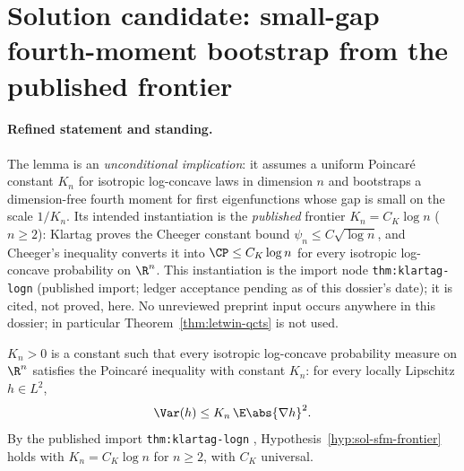 \documentclass[../main.tex]{subfiles}
\begin{document}
%
\section*{Solution candidate: small-gap fourth-moment bootstrap from the published
frontier}
\label{sec:sol-lem-mm-smallgap-fourth-moment}

\paragraph{Refined statement and standing.}
The lemma is an \emph{unconditional implication}: it assumes a uniform Poincar\'e
constant $K_n$ for isotropic log-concave laws in dimension $n$ and bootstraps a
dimension-free fourth moment for first eigenfunctions whose gap is small on the scale
$1/K_n$.  Its intended instantiation is the \emph{published} frontier
$K_n=C_K\log n$ ($n\ge2$): Klartag \cite{Klartag2023Logarithmic} proves the Cheeger
constant bound $\psi_n\le C\sqrt{\log n}$, and Cheeger's inequality converts it into
$\CP\le C_K\log n$ for every isotropic log-concave probability on $\R^n$.  This
instantiation is the import node \texttt{thm:klartag-logn} (published import; ledger
acceptance pending as of this dossier's date); it is cited, not proved, here.  No
unreviewed preprint input occurs anywhere in this dossier; in particular
Theorem~\ref{thm:letwin-qcts} is not used.

\begin{hypothesis}
\label{hyp:sol-sfm-frontier}
$K_n>0$ is a constant such that every isotropic log-concave probability measure on
$\R^n$ satisfies the Poincar\'e inequality with constant $K_n$: for every locally
Lipschitz $h\in L^2$,
\[
  \Var(h)\le K_n\,\E\abs{\nabla h}^2 .
\]
By the published import \texttt{thm:klartag-logn}
\cite{Klartag2023Logarithmic}, Hypothesis~\ref{hyp:sol-sfm-frontier} holds with
$K_n=C_K\log n$ for $n\ge2$, with $C_K$ universal.
\end{hypothesis}
\end{document}
